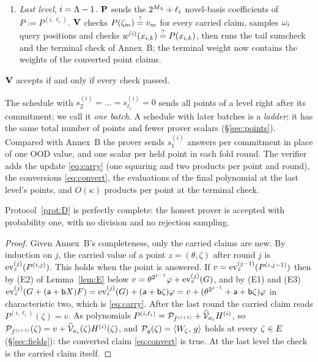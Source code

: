 \begin{protocol}
\begin{enumerate}[itemsep=1pt,topsep=2pt]
\item \emph{Last level}, $i=\Lambda-1$. $\mathbf{P}$ sends the $2^{M_\Lambda}+\ell_i$ novel-basis coefficients of $P:=P^{(i,\ell_i)}$. $\mathbf{V}$ checks $P(\zeta_m)\stackrel{?}{=} v_m$ for every carried claim, samples $\omega_i$ query positions and checks $w^{(i)}(x_{i,k})\stackrel{?}{=} P(x_{i,k})$, then runs the tail sumcheck and the terminal check of Annex~B; the terminal weight now contains the weights of the converted point claims.
\end{enumerate}
$\mathbf{V}$ accepts if and only if every check passed.
\end{protocol}

The schedule with $s^{(i)}_2=\dots=s^{(i)}_{\ell_i}=0$ sends all points of a level right after its commitment; we call it \emph{one batch}. A schedule with later batches is a \emph{ladder}; it has the same total number of points and fewer prover scalars (\S\ref{sec:points}). Compared with Annex~B the prover sends $s^{(i)}_1$ answers per commitment in place of one OOD value, and one scalar per held point in each fold round. The verifier adds the update \eqref{eq:carry} (one squaring and two products per point and round), the conversions \eqref{eq:convert}, the evaluations of the final polynomial at the last level's points, and $O(\kappa)$ products per point at the terminal check.

\begin{proposition}[Completeness]\label{prop:complete}
Protocol~\ref{prot:D} is perfectly complete: the honest prover is accepted with probability one, with no division and no rejection sampling.
\end{proposition}
\begin{proof}
Given Annex~B's completeness, only the carried claims are new. By induction on $j$, the carried value of a point $z=(\theta,\zeta)$ after round $j$ is $\operatorname{ev}^{(j)}_z(P^{(i,j)})$. This holds when the point is answered. If $v=\operatorname{ev}^{(j-1)}_z(P^{(i,j-1)})$ then by (E2) of Lemma~\ref{lem:E} below $v=\theta^{2^{j-1}}\varphi+\operatorname{ev}^{(j)}_z(G)$, and by (E1) and (E3) $\operatorname{ev}^{(j)}_z(G+(\mathsf{a}+\mathsf{b} X)F)=\operatorname{ev}^{(j)}_z(G)+(\mathsf{a}+\mathsf{b}\zeta)\varphi=v+(\theta^{2^{j-1}}+\mathsf{a}+\mathsf{b}\zeta)\varphi$ in characteristic two, which is \eqref{eq:carry}. After the last round the carried claim reads $P^{(i,\ell_i)}(\zeta)=v$. As polynomials $P^{(i,\ell_i)}=\mathcal{P}_{f^{(i+1)}}+\widehat{\mathcal{V}}_{\kappa_i}H^{(i)}$, so $\mathcal{P}_{f^{(i+1)}}(\zeta)=v+\widehat{\mathcal{V}}_{\kappa_i}(\zeta)H^{(i)}(\zeta)$, and $\mathcal{P}_g(\zeta)=\langle W_\zeta,\, g \rangle$ holds at every $\zeta\in E$ (\S\ref{sec:fields}): the converted claim \eqref{eq:convert} is true. At the last level the check is the carried claim itself.
\end{proof}

